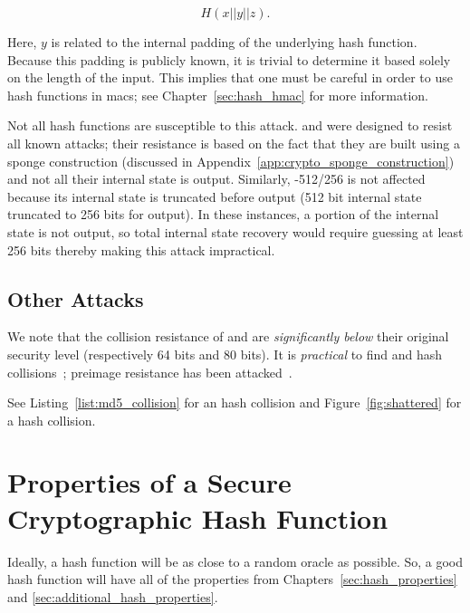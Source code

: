\begin{equation}
    H(x||y||z).
\end{equation}

\noindent
Here, $y$ is related to the internal padding of the underlying
\gls{hash function}.
Because this padding is publicly known,
it is trivial to determine it based solely on the length of the input.
This implies that one must be careful in order to use
\glspl{hash function} in \glspl{mac};
see Chapter~\ref{sec:hash_hmac} for more information.

Not all \glspl{hash function} are susceptible to this attack.
\Keccak{} and \ShaThree{} were designed to resist all known attacks;
their resistance is based on the fact that they are built
using a sponge construction
(discussed in Appendix~\ref{app:crypto_sponge_construction})
and not all their internal state is output.
Similarly, \ShaTwo{}-512/256 is not affected because its internal state
is truncated before output
(512 bit internal state truncated to 256 bits for output).
In these instances, a portion of the internal state is not output,
so total internal state recovery would require guessing at least 256 bits
thereby making this attack impractical.

\subsection{Other Attacks}

We note that the collision resistance of \MDFive{} and \ShaOne{}
are \emph{significantly below} their original security level
(respectively 64 bits and 80 bits).
It is \emph{practical} to find \MDFive{} and \ShaOne{} hash
collisions~\cite{cryptoeprint:2004:199,cryptoeprint:2005:067,
cryptoeprint:2004:356,cryptoeprint:2020:014,rfc6151,rfc6194};
preimage resistance has been attacked~\cite{MD5FastPreimage2009}.

See Listing~\ref{list:md5_collision} for an \MDFive{} hash collision
and Figure~\ref{fig:shattered} for a \ShaOne{} hash collision.





\section{Properties of a Secure Cryptographic Hash Function}

Ideally, a \gls{hash function} will be as close to a
\gls{random oracle} as possible.
So, a good \gls{hash function} will have all of the properties
from Chapters~\ref{sec:hash_properties} and
\ref{sec:additional_hash_properties}.

